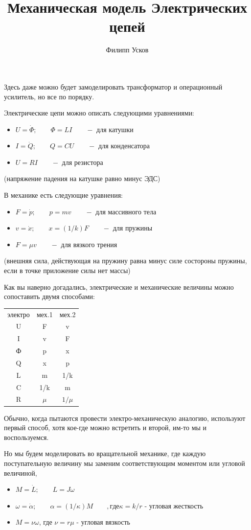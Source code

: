 \documentclass[11pt]{article} %
\title{Механическая модель Электрических цепей}
\author{Филипп Усков}
\begin{document}
\maketitle

Здесь даже можно будет замоделировать трансформатор и операционный усилитель, но все по порядку.

Электрические цепи можно описать следующими уравнениями:
\begin{itemize}
\item $U=\dot \Phi; \qquad \Phi=LI\qquad-$ для катушки 
\item $I=\dot Q; \qquad Q=CU\qquad-$ для конденсатора
\item $U=RI\qquad-$ для резистора
\end{itemize}
(напряжение падения на катушке равно минус ЭДС)

В механике есть следующие уравнения:
\begin{itemize}
\item $F=\dot p; \qquad p=mv \qquad-$ для массивного тела
\item $v=\dot x; \qquad x=(1/k)F \qquad-$ для пружины 
\item $F=\mu v \qquad-$	для вязкого трения
\end{itemize}
(внешняя сила, действующая на пружину равна минус силе состороны пружины, если в точке приложение силы нет массы)

Как вы наверно догадались, электрические и механические величины можно сопоставить двумя способами:

\begin{tabular}{ccc}
электро &мех.1  &мех.2\\
U	&F	&v\\
I	&v	&F\\
Ф	&p	&x\\
Q	&x	&p\\
L	&m	&1/k\\
C	&1/k	&m\\
R	&$\mu$&$1/\mu$
\end{tabular}

Обычно, когда пытаются провести электро-механическую аналогию, используют первый способ, хотя кое-где можно встретить и второй, им-то мы и воспользуемся.

Но мы будем моделировать во вращательной механике, где
каждую поступательную величину мы заменим соответствующим моментом или угловой величиной, 
\begin{itemize}
\item $M=\dot L; \qquad L=J\omega$
\item $\omega=\dot \alpha; \qquad \alpha=(1/\kappa)M \qquad$$, где $$\kappa = k/r$ - угловая жесткость
\item $M=\nu \omega$, где $\nu = r\mu$ - угловая вязкость
\end{itemize}
\end{document}
